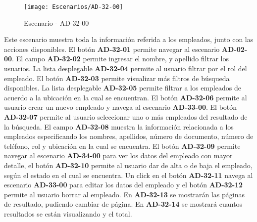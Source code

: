 \begin{figure}[H]
\centering
\texttt{[image: Escenarios/AD-32-00]}
\caption{Escenario - AD-32-00}
\label{fig:AD-32-00}
\end{figure}
Este escenario muestra toda la información referida a los empleados, junto con las acciones disponibles.
El botón \textbf{AD-32-01} permite navegar al escenario \textbf{AD-02-00}. El campo \textbf{AD-32-02} permite ingresar el nombre, y apellido filtrar los usuarios. La lista desplegable \textbf{AD-32-04} permite al usuario filtrar por el rol del empleado. El botón \textbf{AD-32-03} permite visualizar más filtros de búsqueda disponibles. La lista desplegable \textbf{AD-32-05} permite filtrar a los empleados de acuerdo a la ubicación en la cual se encuentran.
El botón \textbf{AD-32-06} permite al usuario crear un nuevo empleado y navega al escenario \textbf{AD-33-00}.
El botón \textbf{AD-32-07} permite al usuario seleccionar uno o más empleados del resultado de la búsqueda. El campo \textbf{AD-32-08} muestra la información relacionada a los empleados  especificando los nombres, apellidos, número de documento, número de teléfono, rol y ubicación en la cual se encuentra. El botón \textbf{AD-32-09} permite navegar al escenario \textbf{AD-34-00} para ver los datos del empleado con mayor detalle, el botón \textbf{AD-32-10} permite al usuario dar de alta o de baja el empleado, según el estado en el cual se encuentra. Un click en el botón \textbf{AD-32-11} navega al escenario \textbf{AD-33-00} para editar los datos del empleado y el botón \textbf{AD-32-12} permite al usuario borrar al empleado.
En  \textbf{AD-32-13} se mostrarán las páginas de resultado, pudiendo cambiar de página. En \textbf{AD-32-14} se mostrará cuantos resultados se están visualizando y el total.
\clearpage
